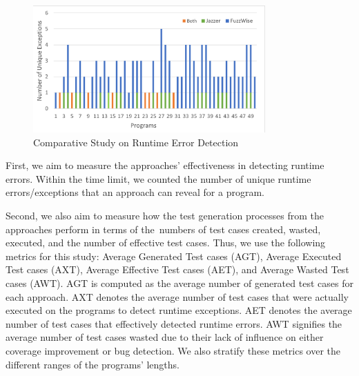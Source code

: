 
\begin{figure}
\begin{center}
\includegraphics[width=3.5in]{RQ1a_Unique Exceptions.png}
\vspace{-21pt}
\caption{Comparative Study on Runtime Error Detection}
\label{fig:rq1-runtime-detection}
\end{center}
\end{figure}

First, we aim to measure the approaches' effectiveness in detecting
runtime errors. Within the time limit, we counted the number of unique
runtime errors/exceptions that an approach can reveal for a
program.


Second, we also aim to measure how the test generation processes from
the approaches perform in terms of the~numbers of test cases created,
wasted, executed, and the number of effective test
cases. Thus, we use the following metrics for this study: Average
Generated Test cases (AGT), Average Executed Test cases (AXT), Average
Effective Test cases (AET), and Average Wasted Test cases (AWT). AGT
is computed as the average number of generated test cases for each
approach. AXT denotes the average number of test cases that were
actually executed on the programs to detect runtime exceptions. AET
denotes the average number of test cases that effectively detected
runtime errors. AWT signifies the average number of test cases
wasted due to their lack of influence on either coverage
improvement or bug detection. We also stratify these metrics over the
different ranges of the programs' lengths.


